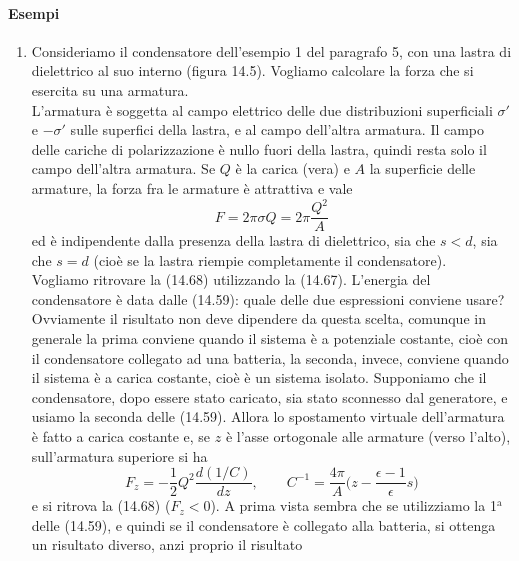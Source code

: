 \paragraph{Esempi}
\begin{enumerate}
  \item Consideriamo il condensatore dell'esempio 1 del paragrafo 5, con una
    lastra di dielettrico al suo interno (figura 14.5). Vogliamo calcolare la
    forza che si esercita su una armatura.\\
    L'armatura \`e soggetta al campo elettrico delle due distribuzioni
    superficiali $\sigma'$ e $-\sigma'$ sulle superfici della lastra, e al campo
    dell'altra armatura. Il campo delle cariche di polarizzazione \`e nullo
    fuori della lastra, quindi resta solo il campo dell'altra armatura. Se $Q$
    \`e la carica (vera) e $A$ la superficie delle armature, la forza fra le
    armature \`e attrattiva e vale
    \begin{equation}
      F=2\pi\sigma Q=2\pi\frac{Q^2}{A}
      \tag{14.68}
    \end{equation}
    ed \`e indipendente dalla presenza della lastra di dielettrico, sia che
    $s<d$, sia che $s=d$ (cio\`e se la lastra riempie completamente il
    condensatore).\\
    Vogliamo ritrovare la (14.68) utilizzando la (14.67). L'energia del
    condensatore \`e data dalle (14.59): quale delle due espressioni conviene
    usare? Ovviamente il risultato non deve dipendere da questa scelta, comunque
    in generale la prima conviene quando il sistema \`e a potenziale costante,
    cio\`e con il condensatore collegato ad una batteria, la seconda, invece,
    conviene quando il sistema \`e a carica costante, cio\`e
    \`e un sistema isolato. Supponiamo che il condensatore, dopo essere stato
    caricato, sia stato sconnesso dal generatore, e usiamo la seconda delle
    (14.59). Allora lo spostamento virtuale dell'armatura \`e fatto a carica
    costante e, se $z$ \`e l'asse ortogonale alle armature (verso l'alto),
    sull'armatura superiore si ha
    \begin{equation}
      F_z=-\frac{1}{2}Q^2\frac{d(1/C)}{dz},
      \qquad C^{-1}=\frac{4\pi}{A}\big(z-\frac{\epsilon-1}{\epsilon}s\big)
      \tag{14.69}
    \end{equation}
    e si ritrova la (14.68) ($F_z<0$). A prima vista sembra che se utilizziamo
    la 1$^\mathrm{a}$ delle (14.59), e quindi se il condensatore \`e collegato
    alla batteria, si ottenga un risultato diverso, anzi proprio il risultato

\end{enumerate}
